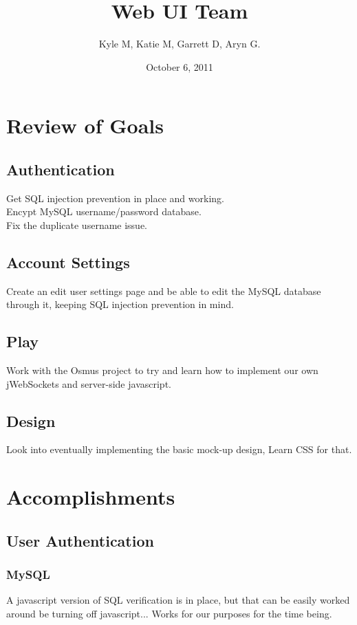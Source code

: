 




\title{Web UI Team}
\author{Kyle M, Katie M, Garrett D, Aryn G.}
\date{October 6, 2011}
\maketitle


\section{Review of Goals}
	\subsection{Authentication}
	Get SQL injection prevention in place and working.\\Encypt MySQL username/password database.\\Fix the duplicate username issue. 
	\subsection{Account Settings}
	Create an edit user settings page and be able to edit the MySQL database through it, keeping SQL injection prevention in mind.
	\subsection{Play}
	Work with the Osmus project to try and learn how to implement our own jWebSockets and server-side javascript.
	\subsection{Design}
	Look into eventually implementing the basic mock-up design, Learn CSS for that.

\section{Accomplishments}
	\subsection{User Authentication}
		\subsubsection{MySQL}
		A javascript version of SQL verification is in place, but that can be easily worked around be turning off javascript... Works for our purposes for the time being.
